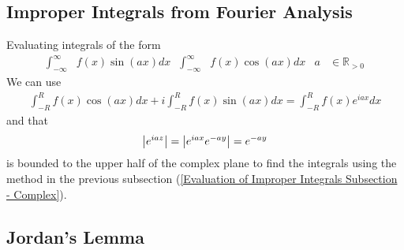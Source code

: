 \documentclass[12pt, english]{book}
\begin{document}
	\subsection{Improper Integrals from Fourier Analysis} \label{Improper Integrals from Fourier Analysis Subsection - Complex}
	
	Evaluating integrals of the form
	\begin{align*}
		\int_{-\infty}^{\infty} &f(x) \sin(ax) dx &
		\int_{-\infty}^{\infty} &f(x) \cos(ax) dx &
		a &\in \mathbb{R}_{>0}
	\end{align*}
	We can use 
	\begin{align*}
		\int_{-R}^{R} f(x) \cos(ax) dx + i \int_{-R}^{R} f(x) \sin(ax) dx 
		= \int_{-R}^{R} f(x) e^{iax} dx
	\end{align*}
	and that 
	\begin{align*}
		\abs{e^{iaz}} = \abs{e^{iax} e^{-ay}} = e^{-ay}
	\end{align*}
	is bounded to the upper half of the complex plane to find the integrals using the method in the previous subsection (\cref{Evaluation of Improper Integrals Subsection - Complex}).
	
	\subsection{Jordan's Lemma} \label{Jordan's Lemma Subsection - Complex}
	
\end{document}
